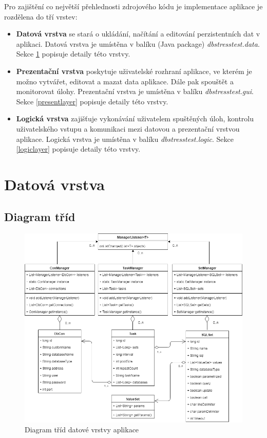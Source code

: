\documentclass[czech,bachelor,public,dept460,male,cpdeclaration,twoside]{diploma}
\begin{document}
Pro zajištění co největší přehlednosti zdrojového kódu je implementace aplikace je rozdělena do tří vrstev:
\begin{itemize}
  	\item \textbf{Datová vrstva} se stará o ukládání, načítání a editování perzistentních dat v aplikaci. Datová vrstva je umístěna v balíku (Java package) \textit{dbstresstest.data}. Sekce \ref{datalayer} popisuje detaily této vrstvy.
  	\item \textbf{Prezentační vrstva} poskytuje uživatelské rozhraní aplikace, ve kterém je možno vytvářet, editovat a mazat data aplikace. Dále pak spouštět a monitorovat úlohy. Prezentační vrstva je umístěna v balíku \textit{dbstresstest.gui}. Sekce \ref{presentlayer} popisuje detaily této vrstvy.
  	\item \textbf{Logická vrstva} zajišťuje vykonávání uživatelem spuštěných úloh, kontrolu uživatelského vstupu a komunikaci mezi datovou a prezentační vrstvou aplikace. Logická vrstva je umístěna v balíku \textit{dbstresstest.logic}. Sekce \ref{logiclayer} popisuje detaily této vrstvy.
\end{itemize} 

\section{Datová vrstva} \label{datalayer}

\subsection{Diagram tříd} \label{datadiagram}
\begin{figure}[!htbp]\centering\includegraphics[width=1.0\textwidth]{Figures/datadiagram.png}\caption{Diagram tříd datové vrstvy aplikace}
\end{figure}
\end{document}
